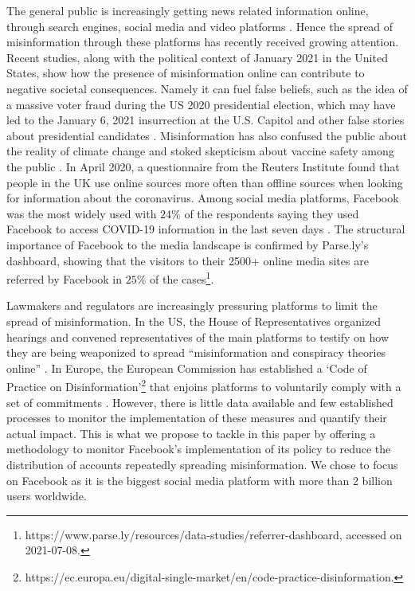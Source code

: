 \documentclass[11pt,a4paper]{article}
\begin{document}
The general public is increasingly getting news related information online, through search engines, social media and video platforms \citep{mitchell2016modern}.
Hence the spread of misinformation through these platforms has recently received growing attention.
Recent studies, along with the political context of January 2021 in the United States, show how the presence of misinformation online can contribute to negative societal consequences.
Namely it can fuel false beliefs, such as the idea of a massive voter fraud during the US 2020 presidential election, which may have led to the January 6, 2021 insurrection at the U.S. Capitol \citep{benkler2020mail} and other false stories about presidential candidates \citep{allcott2017social}. 
Misinformation has also confused the public about the reality of climate change \citep{brulle30years, porter2019can} and stoked skepticism about vaccine safety among the public \citep{featherstone2020feeling, lahouati2020spread}. 
In April 2020, a questionnaire from the Reuters Institute found that people in the UK use online sources more often than offline sources when looking for information about the coronavirus. 
Among social media platforms, Facebook was the most widely used with $24\%$ of the respondents saying they used Facebook to access COVID-19 information in the last seven days \citep{fletcher2020information}. 
The structural importance of Facebook to the media landscape is confirmed by Parse.ly’s dashboard, showing that the visitors to their 2500+ online media sites are referred by Facebook in $25\%$ of the cases\footnote{https://www.parse.ly/resources/data-studies/referrer-dashboard, accessed on 2021-07-08.}.

Lawmakers and regulators are increasingly pressuring platforms to limit the spread of misinformation. 
In the US, the House of Representatives organized hearings and convened representatives of the main platforms to testify on how they are being weaponized to spread ``misinformation and conspiracy theories online'' \citep{donovan2020}. 
In Europe, the European Commission has established a `Code of Practice on Disinformation'\footnote{https://ec.europa.eu/digital-single-market/en/code-practice-disinformation.} that enjoins platforms to voluntarily comply with a set of commitments \citep{heldt2019let}. 
However, there is little data available and few established processes to monitor the implementation of these measures and quantify their actual impact. 
This is what we propose to tackle in this paper by offering a methodology to monitor Facebook’s implementation of its policy to reduce the distribution of accounts repeatedly spreading misinformation. 
We chose to focus on Facebook as it is the biggest social media platform with more than 2 billion users worldwide.
\end{document}
